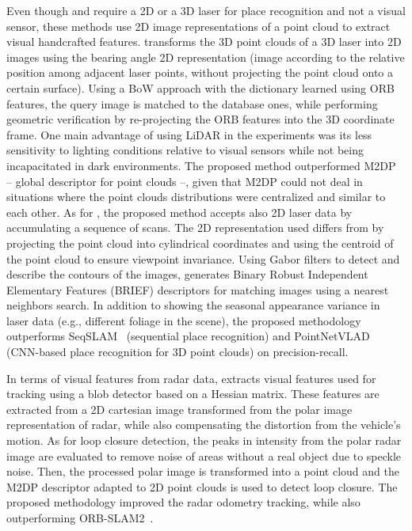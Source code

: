 Even though \cite{cao-et-al:2018:2815956} and \cite{cao-et-al:2021:2962416} require a 2D or a 3D laser for place recognition and not a visual sensor, these methods use 2D image representations of a point cloud to extract visual handcrafted features.
\cite{cao-et-al:2018:2815956} transforms the 3D point clouds of a 3D laser into 2D images using the bearing angle 2D representation (image according to the relative position among adjacent laser points, without projecting the point cloud onto a certain surface). Using a BoW approach with the dictionary learned using ORB features, the query image is matched to the database ones, while performing geometric verification by re-projecting the ORB features into the 3D coordinate frame. One main advantage of using LiDAR in the experiments was its less sensitivity to lighting conditions relative to visual sensors while not being incapacitated in dark environments. The proposed method outperformed M2DP~\parencite{discussion:m2dp} -- global descriptor for point clouds --, given that M2DP could not deal in situations where the point clouds distributions were centralized and similar to each other.
As for \cite{cao-et-al:2021:2962416}, the proposed method accepts also 2D laser data by accumulating a sequence of scans. The 2D representation used differs from \cite{cao-et-al:2018:2815956} by projecting the point cloud into cylindrical coordinates and using the centroid of the point cloud to ensure viewpoint invariance.
Using Gabor filters to detect and describe the contours of the images, \cite{cao-et-al:2021:2962416} generates Binary Robust Independent Elementary Features (BRIEF) descriptors for matching images using a nearest neighbors search. In addition to showing the seasonal appearance variance in laser data (e.g., different foliage in the scene), the proposed methodology outperforms SeqSLAM~\parencite{discussion:seqslam} (sequential place recognition) and PointNetVLAD~\parencite{discussion:pointnetvlad} (CNN-based place recognition for 3D point clouds) on precision-recall.

In terms of visual features from radar data, \cite{hong-et-al:2022:02783649221080483} extracts visual features used for tracking using a blob detector based on a Hessian matrix. These features are extracted from a 2D cartesian image transformed from the polar image representation of radar, while also compensating the distortion from the vehicle's motion.
As for loop closure detection, the peaks in intensity from the polar radar image are evaluated to remove noise of areas without a real object due to speckle noise. Then, the processed polar image is transformed into a point cloud and the M2DP descriptor adapted to 2D point clouds is used to detect loop closure.
The proposed methodology improved the radar odometry tracking, while also outperforming ORB-SLAM2~\parencite{discussion:orb-slam2}.



